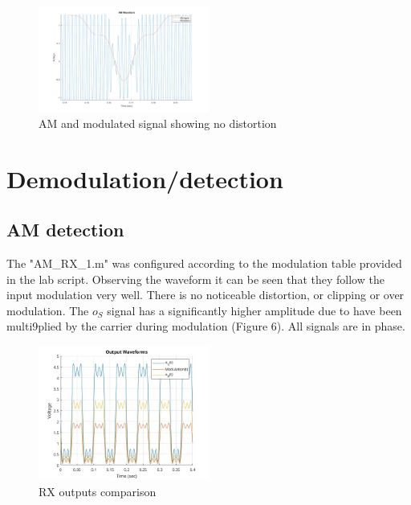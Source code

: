 \documentclass[a4paper]{article}
\begin{document}
        \begin{figure}[htbp]
        \centering
        \includegraphics[width=0.5\textwidth]{Images/AM_RX_1/Triangular Wave/Zoomed.png}
        \caption{AM and modulated signal showing no distortion}

        \end{figure}


        \section{Demodulation/detection}

        \subsection{AM detection}
        The "AM\_RX\_1.m" was configured according to the modulation table provided in the lab script. Observing the waveform it can be seen that they follow the input modulation very well. There is no noticeable distortion, or clipping or over modulation. The $o_S$ signal has a significantly higher amplitude due to have been multi9plied by the carrier during modulation (Figure 6). All signals are in phase.

        \begin{figure}[htbp]
        \centering

        \includegraphics[width=0.5\textwidth]{Images/AM_RX_1/Square Wave/Output Waveforms.jpg}
        \caption{RX outputs comparison}

        \end{figure}
\end{document}

